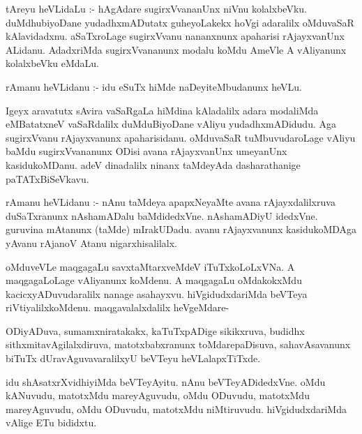 \documentclass{article}
\begin{document}
\begin{mn}
tAreyu  heVLidaLu :- hAgAdare  sugirxVvananUnx  niVnu  kolalxbeVku.  duMdhubiyoDane  yudadhxmADutatx  guheyoLakekx  hoVgi  
adaralilx  oMduvaSaR  kAlavidadxnu.  aSaTxroLage  sugirxVvanu  nananxnunx  apaharisi  rAjayxvanUnx  ALidanu.  AdadxriMda  
sugirxVvananunx  modalu  koMdu  AmeVle  A  vAliyanunx  kolalxbeVku  eMdaLu.
\end{mn}

\begin{mn}
rAmanu  heVLidanu :- idu  eSuTx  hiMde  naDeyiteMbudanunx  heVLu.
\end{mn}

\begin{mn}
Igeyx  aravatutx sAvira  vaSaRgaLa  hiMdina  kAladalilx  adara  modaliMda  eMBatatxneV  vaSaRdalilx  duMduBiyoDane  vAliyu  
yudadhxmADidudu. Aga  sugirxVvanu  rAjayxvanunx  apaharisidanu.  oMduvaSaR  tuMbuvudaroLage  vAliyu  baMdu  sugirxVvananunx  
ODisi  avana  rAjayxvanUnx  umeyanUnx  kasidukoMDanu.  adeV  dinadalilx  ninanx  taMdeyAda  dasharathanige  paTATxBiSeVkavu.
\end{mn}

\begin{mn}
rAmanu  heVLidanu :- nAnu  taMdeya  apapxNeyaMte  avana  rAjayxdalilxruva  duSaTxranunx  nAshamADalu  baMdidedxVne.  nAshamADiyU  
idedxVne.  guruvina  mAtanunx (taMde) mIrakUDadu.  avanu  rAjayxvanunx  kasidukoMDAga  yAvanu  rAjanoV  Atanu  nigarxhisalilalx.
\end{mn}

\begin{mn}
oMduveVLe  maqgagaLu  savxtaMtarxveMdeV  iTuTxkoLoLxVNa.  A maqgagaLoLage  vAliyanunx  koMdenu.  A  maqgagaLu  oMdakokxMdu  
kacicxyADuvudaralilx  nanage  asahayxvu.  hiVgidudxdariMda  beVTeya  riVtiyalilxkoMdenu.  maqgavalalxdalilx  heVgeMdare-
\end{mn}

\begin{mn}
ODiyADuva,  sumamxniratakakx,  kaTuTxpADige  sikikxruva,  budidhx sithxmitavAgilalxdiruva,  matotxbabxranunx  toMdarepaDisuva,  
sahavAsavanunx  biTuTx  dUravAguvavaralilxyU  beVTeyu  heVLalapxTiTxde.
\end{mn}

\begin{mn}
idu  shAsatxrXvidhiyiMda  beVTeyAyitu.  nAnu  beVTeyADidedxVne.  oMdu  kANuvudu,  matotxMdu  mareyAguvudu,  oMdu  ODuvudu,  matotxMdu  
mareyAguvudu,  oMdu  ODuvudu,  matotxMdu  niMtiruvudu.  hiVgidudxdariMda  vAlige  ETu  bididxtu.
\end{mn}
\end{document}
